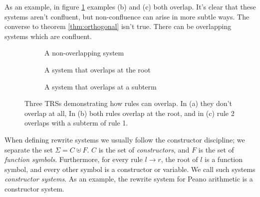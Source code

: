 \documentclass{book}
\theoremstyle{definition}
\begin{document}
As an example, in figure \ref{fig:overlap} examples (b) and (c) both overlap.
It's clear that these systems aren't confluent,
but non-confluence can arise in more subtle ways.
The converse to theorem \ref{thm:orthogonal} isn't true. There can be overlapping systems which are confluent.

\begin{figure}[h]
    \begin{subfigure}{.29\textwidth}
    \caption{A non-overlapping system}
    \end{subfigure}
    \begin{subfigure}{.29\textwidth}
    \caption{A system that overlaps at the root}
    \end{subfigure}
    \begin{subfigure}{.29\textwidth}
    \caption{A system that overlaps at a subterm}
    \end{subfigure}
    \label{fig:overlap}
    \caption{Three TRSs demonstrating how rules can overlap.
            In (a) they don't overlap at all,
            In (b) both rules overlap at the root,
            and in (c) rule 2 overlaps with a subterm of rule 1.}
    \label{fig:overlap}
\end{figure}

When defining rewrite systems we usually follow the constructor discipline;
we separate the set $\Sigma = C \uplus F$.
$C$ is the set of \textit{constructors},
and $F$ is the set of \textit{function symbols}.
Furthermore, for every rule $l \to r$, the root of $l$ is a function symbol, 
and every other symbol is a constructor or variable.
We call such systems \textit{constructor systems}.
As an example, the rewrite system for Peano arithmetic is a constructor system.
\end{document}
